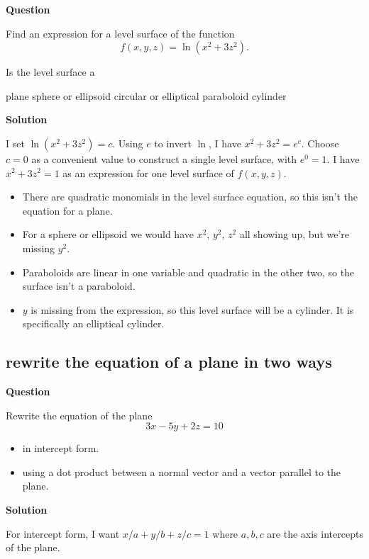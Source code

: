 \documentclass[12pt,letterpaper,noanswers]{exam}
\begin{document}
\noindent\textbf{Question}

Find an expression for a level surface of the function \[f(x,y,z) = \ln{(x^2+3z^2)}.\]

Is the level surface a 

\begin{oneparcheckboxes}
\choice plane
\choice sphere or ellipsoid
\choice circular or elliptical paraboloid
\choice cylinder
\end{oneparcheckboxes}



\vspace{0.2cm}\noindent\textbf{Solution}


I set $\ln(x^2 + 3z^2) = c$.  Using $e$ to invert $\ln$, I have $x^2+3z^2 = e^c$.  Choose $c = 0$ as a convenient value to construct a single level surface, with $e^0 = 1$.  I have $x^2 + 3z^2 =1$ as an expression for one level surface of $f(x,y,z)$.

\begin{itemize}
    \item There are quadratic monomials in the level surface equation, so this isn't the equation for a plane.
    \item For a sphere or ellipsoid we would have $x^2$, $y^2$, $z^2$ all showing up, but we're missing $y^2$.
    \item Paraboloids are linear in one variable and quadratic in the other two, so the surface isn't a paraboloid.
    \item $y$ is missing from the expression, so this level surface will be a cylinder.  It is specifically an elliptical cylinder.
\end{itemize}


\subsection{rewrite the equation of a plane in two ways}

\noindent\textbf{Question}


Rewrite the equation of the plane
\[3x -5y +2z = 10 \]
\begin{itemize}
\itemsep0em
    \item in intercept form.
    \item using a dot product between a normal vector and a vector parallel to the plane.
\end{itemize}

\noindent\textbf{Solution}

For intercept form, I want $x/a + y/b + z/c = 1$ where $a, b, c$ are the axis intercepts of the plane.
\end{document}
